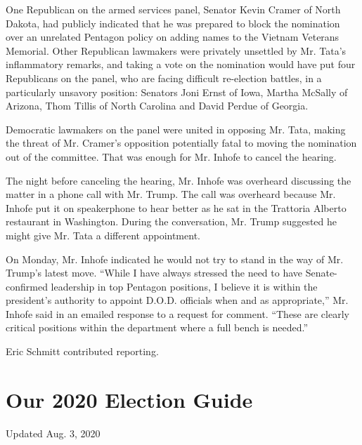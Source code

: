 One Republican on the armed services panel, Senator Kevin Cramer of
North Dakota, had publicly indicated that he was prepared to block the
nomination over an unrelated Pentagon policy on adding names to the
Vietnam Veterans Memorial. Other Republican lawmakers were privately
unsettled by Mr. Tata's inflammatory remarks, and taking a vote on the
nomination would have put four Republicans on the panel, who are facing
difficult re-election battles, in a particularly unsavory position:
Senators Joni Ernst of Iowa, Martha McSally of Arizona, Thom Tillis of
North Carolina and David Perdue of Georgia.

Democratic lawmakers on the panel were united in opposing Mr. Tata,
making the threat of Mr. Cramer's opposition potentially fatal to moving
the nomination out of the committee. That was enough for Mr. Inhofe to
cancel the hearing.

The night before canceling the hearing, Mr. Inhofe was overheard
discussing the matter in a phone call with Mr. Trump. The call was
overheard because Mr. Inhofe put it on speakerphone to hear better as he
sat in the Trattoria Alberto restaurant in Washington. During the
conversation, Mr. Trump suggested he might give Mr. Tata a different
appointment.

On Monday, Mr. Inhofe indicated he would not try to stand in the way of
Mr. Trump's latest move. ``While I have always stressed the need to have
Senate-confirmed leadership in top Pentagon positions, I believe it is
within the president's authority to appoint D.O.D. officials when and as
appropriate,'' Mr. Inhofe said in an emailed response to a request for
comment. ``These are clearly critical positions within the department
where a full bench is needed.''

Eric Schmitt contributed reporting.

\hypertarget{our-2020-election-guide}{%
\section{Our 2020 Election Guide}\label{our-2020-election-guide}}

Updated Aug. 3, 2020

